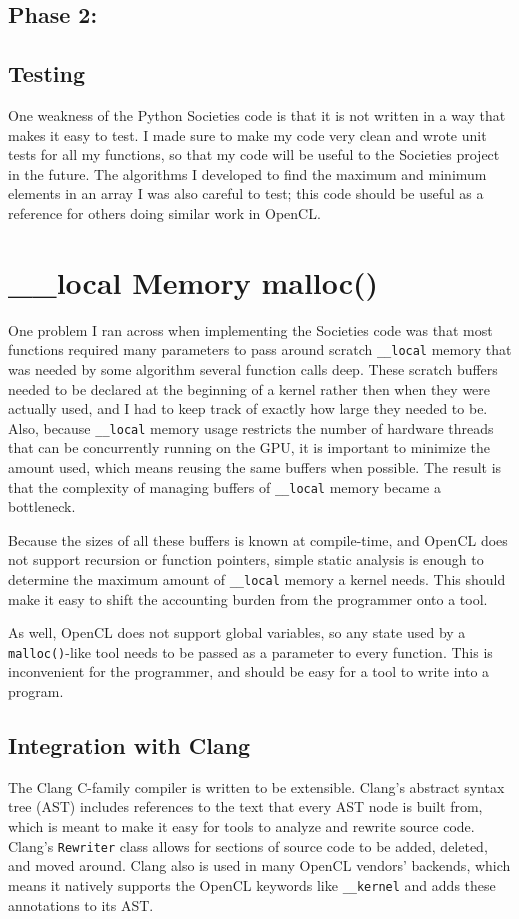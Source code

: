 \documentclass{article}
\begin{document}
\subsection{Phase 2: }


\subsection{Testing}
One weakness of the Python Societies code is that it is not written in a way that makes it easy to test. I made sure to make my code very clean  and wrote unit tests for all my functions, so that my code will be useful to the Societies project in the future. The algorithms I developed to find the maximum and minimum elements in an array I was also careful to test; this code should be useful as a reference for others doing similar work in OpenCL.

\section{\_\_local Memory malloc()}
One problem I ran across when implementing the Societies code was that most functions required many parameters to pass around scratch \texttt{\_\_local} memory that was needed by some algorithm several function calls deep. These scratch buffers needed to be declared at the beginning of a kernel rather then when they were actually used, and I had to keep track of exactly how large they needed to be. Also, because \texttt{\_\_local} memory usage restricts the number of hardware threads that can be concurrently running on the GPU, it is important to minimize the amount used, which means reusing the same buffers when possible. The result is that the complexity of managing buffers of \texttt{\_\_local} memory became a bottleneck.

Because the sizes of all these buffers is known at compile-time, and OpenCL does not support recursion or function pointers, simple static analysis is enough to determine the maximum amount of \texttt{\_\_local} memory a kernel needs. This should make it easy to shift the accounting burden from the programmer onto a tool.

As well, OpenCL does not support global variables, so any state used by a \texttt{malloc()}-like tool needs to be passed as a parameter to every function. This is inconvenient for the programmer, and should be easy for a tool to write into a program.

\subsection{Integration with Clang}
The Clang C-family compiler is written to be extensible. Clang's abstract syntax tree (AST) includes references to the text that every AST node is built from, which is meant to make it easy for tools to analyze and rewrite source code. Clang's \texttt{Rewriter} class allows for sections of source code to be added, deleted, and moved around. Clang also is used in many OpenCL vendors' backends, which means it natively supports the OpenCL keywords like \texttt{\_\_kernel} and adds these annotations to its AST.
\end{document}
